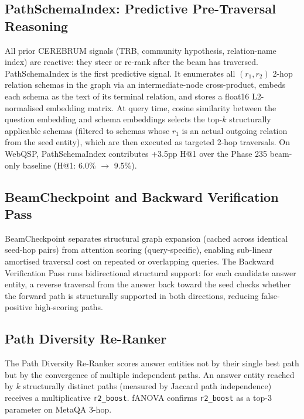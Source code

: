 \documentclass[11pt,a4paper]{article}
\begin{document}
\subsection{PathSchemaIndex: Predictive Pre-Traversal Reasoning}
\label{sec:psi}

All prior CEREBRUM signals (TRB, community hypothesis, relation-name index) are
reactive: they steer or re-rank after the beam has traversed.
PathSchemaIndex is the first predictive signal. It enumerates all $(r_1, r_2)$
2-hop relation schemas in the graph via an intermediate-node cross-product,
embeds each schema as the text of its terminal relation, and stores a float16
L2-normalised embedding matrix. At query time, cosine similarity between the
question embedding and schema embeddings selects the top-$k$ structurally
applicable schemas (filtered to schemas whose $r_1$ is an actual outgoing
relation from the seed entity), which are then executed as targeted 2-hop
traversals. On WebQSP, PathSchemaIndex contributes +3.5pp H@1 over the Phase 235
beam-only baseline (H@1: 6.0\% $\rightarrow$ 9.5\%).

\subsection{BeamCheckpoint and Backward Verification Pass}

BeamCheckpoint separates structural graph expansion (cached across identical
seed-hop pairs) from attention scoring (query-specific), enabling sub-linear
amortised traversal cost on repeated or overlapping queries. The Backward
Verification Pass runs bidirectional structural support: for each candidate answer
entity, a reverse traversal from the answer back toward the seed checks whether
the forward path is structurally supported in both directions, reducing
false-positive high-scoring paths.

\subsection{Path Diversity Re-Ranker}

The Path Diversity Re-Ranker scores answer entities not by their single best path
but by the convergence of multiple independent paths. An answer entity reached by
$k$ structurally distinct paths (measured by Jaccard path independence) receives
a multiplicative \texttt{r2\_boost}. fANOVA confirms \texttt{r2\_boost} as a
top-3 parameter on MetaQA 3-hop.

\end{document}
